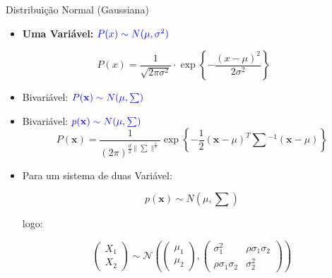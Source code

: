 Distribuição Normal (Gaussiana)

\begin{itemize}
    \item \textbf{Uma Variável:} $\color{blue}{P(x) \sim N(\mu, \sigma^2)}$
\end{itemize}

\begin{equation*}
    P(x) = \dfrac{1}{\sqrt{2\pi\sigma^2}}\cdot 
    \exp\left\{-\frac{(x-\mu)^2}{2\sigma^2}\right\}
\end{equation*}





\begin{itemize}
    \item Bivariável: $\color{blue}{P(\mathbf{x}) \sim N(\mu, \textstyle\sum)}$
\end{itemize}







\begin{itemize}
    \item Bivariável: $\color{blue}{p(\mathbf{x}) \sim N(\mu, \textstyle\sum)}$
\begin{equation*}
    P(\mathbf{x}) = \frac{1}{(2\pi)^{\frac{d}{2}\|\textstyle\sum\|^{\frac{1}{2}}}}\exp\left\{-\frac{1}{2} (\mathbf{x}-\mu)^T\textstyle\sum{}^{-1}(\mathbf{x}-\mu)\right\}
\end{equation*}

\item Para um sistema de duas Variável:

\begin{equation*}
    p(\mathbf{x}) \sim N(\mu, \textstyle\sum)
\end{equation*}
    
logo:     

\begin{equation*}
    \begin{pmatrix}
        X_1 \\
        X_2
    \end{pmatrix}  \sim \mathcal{N} \left( \begin{pmatrix}
        \mu_1 \\
        \mu_2
    \end{pmatrix} , \begin{pmatrix}
        \sigma^2_1 &  \rho \sigma_1 \sigma_2 \\
        \rho \sigma_1 \sigma_2 &  \sigma^2_2
    \end{pmatrix} \right)
\end{equation*}
\end{itemize}


